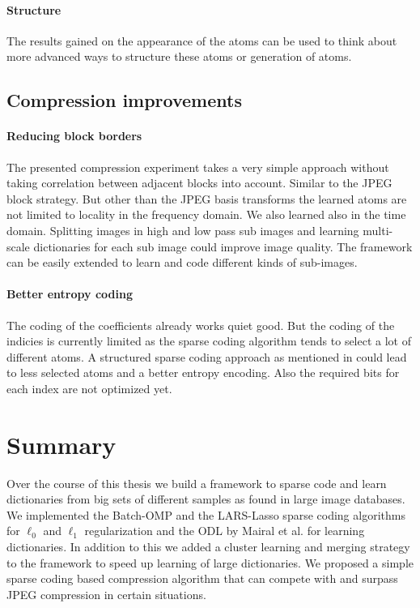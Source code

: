 \paragraph{Structure}
The results gained on the appearance of the atoms can be used to think
about more advanced ways to structure these atoms or generation of atoms.
 

\subsection{Compression improvements}


\paragraph{Reducing block borders} The presented compression experiment
takes a very simple approach without taking correlation between adjacent
blocks into account. Similar to the JPEG block strategy. But other than
the JPEG basis transforms the learned atoms are not limited to locality in the
frequency domain. We also learned also in the time domain. 
Splitting images in high and low pass sub images and learning multi-scale
dictionaries for each sub image could improve image quality. The framework can
be easily extended to learn and code different kinds of sub-images.

\paragraph{Better entropy coding}
The coding of the coefficients already works quiet good. But the coding of the
indicies is currently limited as the sparse coding algorithm tends to select a
lot of different atoms. A structured sparse coding approach as mentioned in
 could lead to less selected atoms and a better
entropy encoding. Also the required bits for each index are not optimized yet.


\section{Summary}
Over the course of this thesis we build a framework to sparse code and learn
dictionaries from big sets of different samples as found in large image
databases. We implemented the Batch-OMP and the LARS-Lasso sparse coding
algorithms for $\ell_0$ and $\ell_1$ regularization and the ODL by Mairal et
al. for learning dictionaries. 
In addition to this we added a cluster learning and merging strategy to the
framework to speed up learning of large dictionaries.
We proposed a simple sparse coding based compression algorithm that can compete
with and surpass JPEG compression in certain situations.









